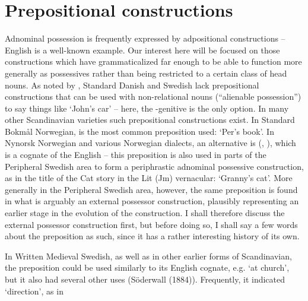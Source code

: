 {%

\section{Prepositional constructions}
\label{bkm:Ref136433022}
Adnominal possession is frequently expressed by adpositional constructions – English is a well-known example. Our interest here will be focused on those constructions which have grammaticalized far enough to be able to function more generally as possessives rather than being restricted to a certain class of head nouns. As noted by \citet[43]{Delsing2003a}, Standard Danish and Swedish lack prepositional constructions that can be used with non-relational nouns (“alienable possession”) to say things like ‘John’s car’ – here, the -genitive is the only option. In many other Scandinavian varieties such prepositional constructions exist. In Standard Bokmål Norwegian,  is the most common preposition used:  ‘Per’s book’. In Nynorsk Norwegian and various Norwegian dialects, an alternative is (\citet[263]{FaarlundEtAl1997}, \citet[43]{Delsing2003a}), which is a cognate of the English  – this preposition is also used in parts of the Peripheral Swedish area to form a periphrastic adnominal possessive construction, as in the title of the Cat story in the Lit (Jm) vernacular: ‘Granny’s cat’. More generally in the Peripheral Swedish area, however, the same preposition is found in what is arguably an external possessor construction, plausibly representing an earlier stage in the evolution of the construction. I shall therefore discuss the external possessor construction first, but before doing so, I shall say a few words about the preposition as such, since it has a rather interesting history of its own. 


In Written Medieval Swedish, as well as in other earlier forms of Scandinavian, the preposition  could be used similarly to its English cognate, e.g.  ‘at church’, but it also had several other uses (Söderwall (1884)). Frequently, it indicated ‘direction’, as in

}
